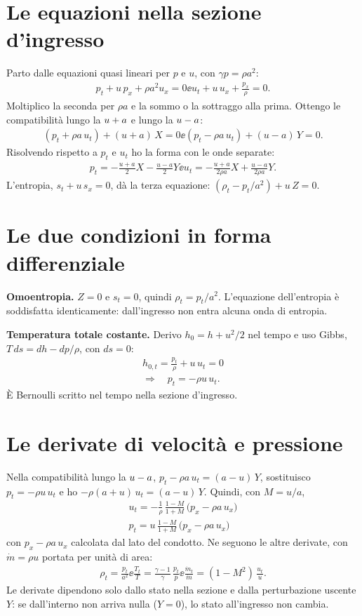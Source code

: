 \section*{Le equazioni nella sezione d'ingresso}
Parto dalle equazioni quasi lineari per $p$ e $u$, con $\gamma p=\rho a^2$:
\begin{gather*}
  p_t+u\,p_x+\rho a^2u_x=0 \ee u_t+u\,u_x+\frac{p_x}{\rho}=0 .
\end{gather*}
Moltiplico la seconda per $\rho a$ e la sommo o la sottraggo alla prima. Ottengo le compatibilità lungo la $u+a$ e
lungo la $u-a$:
\begin{gather*}
  (p_t+\rho a\,u_t)+(u+a)\,X=0 \ee (p_t-\rho a\,u_t)+(u-a)\,Y=0 .
\end{gather*}
Risolvendo rispetto a $p_t$ e $u_t$ ho la forma con le onde separate:
\begin{gather*}
  p_t=-\frac{u+a}{2}X-\frac{u-a}{2}Y \ee u_t=-\frac{u+a}{2\rho a}X+\frac{u-a}{2\rho a}Y .
\end{gather*}
L'entropia, $s_t+u\,s_x=0$, dà la terza equazione: $(\rho_t-p_t/a^2)+u\,Z=0$.

\section*{Le due condizioni in forma differenziale}
\textbf{Omoentropia.} $Z=0$ e $s_t=0$, quindi $\rho_t=p_t/a^2$. L'equazione dell'entropia è soddisfatta
identicamente: dall'ingresso non entra alcuna onda di entropia.

\textbf{Temperatura totale costante.} Derivo $h_0=h+u^2/2$ nel tempo e uso Gibbs, $T\,ds=dh-dp/\rho$, con $ds=0$:
\begin{gather*}
  h_{0,t}=\frac{p_t}{\rho}+u\,u_t=0 \\
  \Longrightarrow\quad p_t=-\rho u\,u_t .
\end{gather*}
È Bernoulli scritto nel tempo nella sezione d'ingresso.

\section*{Le derivate di velocità e pressione}
Nella compatibilità lungo la $u-a$, $p_t-\rho a\,u_t=(a-u)\,Y$, sostituisco $p_t=-\rho u\,u_t$ e ho
$-\rho(a+u)\,u_t=(a-u)\,Y$. Quindi, con $M=u/a$,
\begin{gather*}
  \boxed{u_t=-\frac{1}{\rho}\,\frac{1-M}{1+M}\,\bigl(p_x-\rho a\,u_x\bigr)} \\
  \boxed{p_t=u\,\frac{1-M}{1+M}\,\bigl(p_x-\rho a\,u_x\bigr)}
\end{gather*}
con $p_x-\rho a\,u_x$ calcolata dal lato del condotto. Ne seguono le altre derivate, con $\dot m=\rho u$ portata per
unità di area:
\begin{gather*}
  \rho_t=\frac{p_t}{a^2} \ee \frac{T_t}{T}=\frac{\gamma-1}{\gamma}\,\frac{p_t}{p} \ee
  \frac{\dot m_t}{\dot m}=(1-M^2)\,\frac{u_t}{u}.
\end{gather*}
Le derivate dipendono solo dallo stato nella sezione e dalla perturbazione uscente $Y$: se dall'interno non arriva
nulla ($Y=0$), lo stato all'ingresso non cambia.

